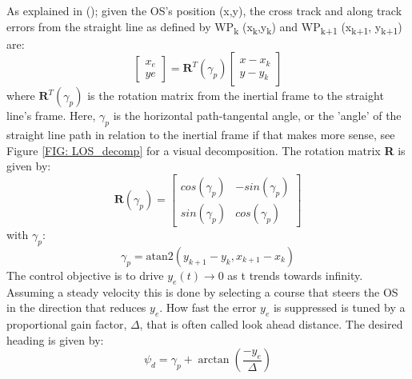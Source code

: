 As explained in (\cite{lekkas2013line}); given the \gls{OS}'s position (x,y), the cross track and along track errors from the straight line as defined by WP\textsubscript{k} (x\textsubscript{k},y\textsubscript{k})
and WP\textsubscript{k+1} (x\textsubscript{k+1}, y\textsubscript{k+1}) are:
\begin{equation}\label{EQ: cross and along track error} %
    \begin{bmatrix}
        x_e \\
         ye
    \end{bmatrix} = \textbf{R}^T(\gamma_p) \begin{bmatrix}
                                            x - x_k \\
                                            y - y_k
                                            \end{bmatrix}
\end{equation}
where $\textbf{R}^T(\gamma_p)$ is the rotation matrix from the inertial frame to the straight line's frame. Here, $\gamma_p$ is the horizontal path-tangental angle,
or the 'angle' of the straight line path in relation to the inertial frame if that makes more sense, see Figure \ref{FIG: LOS_decomp} for a visual
decomposition. The rotation matrix \textbf{R} is given by:
\begin{equation} %
    \textbf{R}(\gamma_p) = \begin{bmatrix}
                            cos(\gamma_p) & -sin(\gamma_p) \\
                            sin(\gamma_p) & cos(\gamma_p)
                            \end{bmatrix}
\end{equation}
with $\gamma_p$:
\begin{equation} %
    \gamma_p = \textrm{atan2}(y_{k+1} - y_k , x_{k+1} - x_k)
\end{equation}
The control objective is to drive $y_{e}(t) \rightarrow 0$ as t trends towards infinity. Assuming a steady velocity this is done by
selecting a course that steers the \gls{OS} in the direction that reduces $y_e$. How fast the error $y_e$ is suppressed is
tuned by a proportional gain factor, $\varDelta$, that is often called look ahead distance. The desired heading is given by:
\begin{equation} %
    \psi_d = \gamma_p + \arctan(\frac{-y_e}{\varDelta})
\end{equation}
